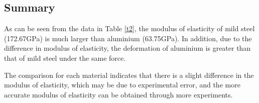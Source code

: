 \subsection*{Summary}

As can be seen from the data in Table \ref{t2}, 
the modulus of elasticity of mild steel (172.67GPa) is much larger than aluminium (63.75GPa).
In addition, due to the difference in modulus of elasticity, the deformation of aluminium is 
greater than that of mild steel under the same force.

The comparison for each material indicates that there is a slight difference 
in the modulus of elasticity, 
which may be due to experimental error, and the more accurate 
modulus of elasticity can be obtained through more 
experiments.
